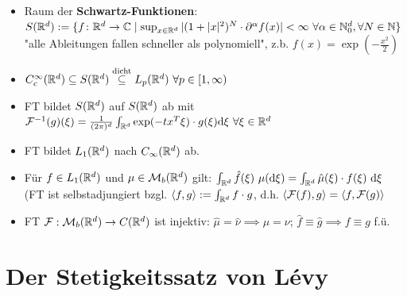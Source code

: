 \documentclass[12pt]{scrartcl}
\begin{document}
	\begin{itemize}
		\item Raum der \textbf{Schwartz-Funktionen}: $S(\mathbb{R}^d):=\lbrace f\colon\mathbb{R}^d\to\mathbb{C}\mid\sup_{x\in\mathbb{R}^d}|(1+|x|^2)^N\cdot\partial^\alpha f(x)|<\infty~\forall\alpha\in\mathbb{N}^d_0,\forall N\in\mathbb{N}\rbrace$ "alle Ableitungen fallen schneller als polynomiell", z.b. $f(x)=\exp(-\frac{x^2}{2})$
		\item $C_c^\infty(\mathbb{R}^d)\subseteq S(\mathbb{R}^d)\overset{\text{dicht}}{\subseteq} L_p(\mathbb{R}^d)~\forall p\in[1,\infty)$
		\item FT bildet $S(\mathbb{R}^d)$  auf $S(\mathbb{R}^d)$ ab mit $\mathcal{F}^{-1}(g)(\xi)=\frac{1}{(2\pi)^d}\int_{\mathbb{R}^d}\exp(-t x^T\xi)\cdot g(\xi)\mathrm{d}\xi~\forall\xi\in\mathbb{R}^d$
		\item {} FT bildet $L_1(\mathbb{R}^d)$ nach $C_\infty(\mathbb{R}^d)$ ab.
		\item {} Für $f\in L_1(\mathbb{R}^d)$ und $\mu\in\mathcal{M}_b(\mathbb{R}^d)$ gilt: $\int_{\mathbb{R}^d}\hat{f}(\xi)~\mu(\mathrm{d}\xi)=\int_{\mathbb{R}^d}\hat{\mu}(\xi)\cdot f(\xi)~\mathrm{d}\xi$ (FT ist selbstadjungiert bzgl. $\langle f,g\rangle:=\int_{\mathbb{R}^d} f\cdot g$, d.h. $\langle\mathcal{F}(f),g\rangle=\langle f,\mathcal{F}(g)\rangle$
		\item {} FT $\mathcal{F}:\mathcal{M}_b(\mathbb{R}^d)\to C(\mathbb{R}^d)$ ist injektiv: $\hat{\mu}=\hat{\nu}\implies \mu=\nu$; $\hat{f}\equiv\hat{g}\implies f\equiv g$ f.ü.
	\end{itemize}
	
	\section{Der Stetigkeitssatz von Lévy}
	
\end{document}
